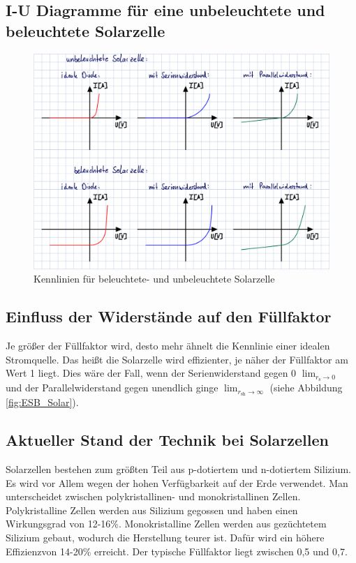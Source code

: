 \documentclass[a4paper]{scrartcl}
\numberwithin{equation}{subsection}
\begin{document}
\subsection{I-U Diagramme für eine unbeleuchtete und beleuchtete Solarzelle}

\begin{figure}[H]
\includegraphics[width=16cm]{Kennlinie}
\centering
\caption{Kennlinien für beleuchtete- und unbeleuchtete Solarzelle}
\centering
\label{fig:Kennlinien}
\end{figure}

\subsection{Einfluss der Widerstände auf den Füllfaktor}
Je größer der Füllfaktor wird, desto mehr ähnelt die Kennlinie einer idealen Stromquelle. Das heißt die
Solarzelle wird effizienter, je näher der Füllfaktor am Wert 1 liegt. Dies wäre der Fall, wenn
der Serienwiderstand gegen 0 $\lim_{r_{\text{s}} \to 0}$ und der Parallelwiderstand gegen unendlich ginge
$\lim_{r_{\text{sh}} \to \infty}$ (siehe Abbildung \ref{fig:ESB_Solar}).

\subsection{Aktueller Stand der Technik bei Solarzellen}
Solarzellen bestehen zum größten Teil aus p-dotiertem und n-dotiertem Silizium.
Es wird vor Allem wegen der hohen Verfügbarkeit auf der Erde verwendet.
Man unterscheidet zwischen polykristallinen- und monokristallinen Zellen.
Polykristalline Zellen werden aus Silizium gegossen und haben einen Wirkungsgrad
von 12-16\%. Monokristalline Zellen werden aus gezüchtetem Silizium gebaut, wodurch die Herstellung
teurer ist. Dafür wird ein höhere Effizienzvon 14-20\% erreicht. Der typische Füllfaktor liegt
zwischen 0,5 und 0,7.
\end{document}
